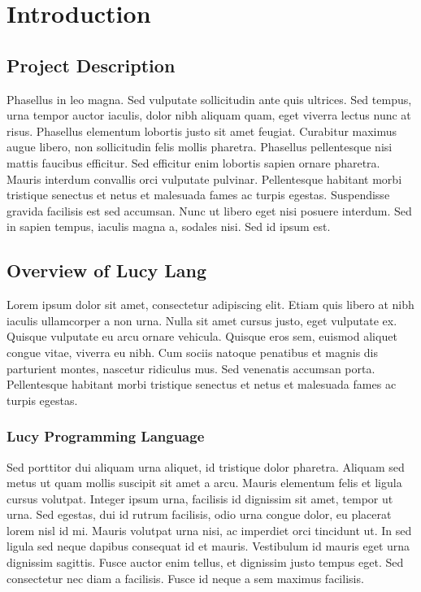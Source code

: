 \chapter{Introduction}


\section{Project Description}
Phasellus in leo magna. Sed vulputate sollicitudin ante quis ultrices. Sed tempus, urna tempor auctor iaculis, dolor nibh aliquam quam, eget viverra lectus nunc at risus. Phasellus elementum lobortis justo sit amet feugiat. Curabitur maximus augue libero, non sollicitudin felis mollis pharetra. Phasellus pellentesque nisi mattis faucibus efficitur. Sed efficitur enim lobortis sapien ornare pharetra. Mauris interdum convallis orci vulputate pulvinar. Pellentesque habitant morbi tristique senectus et netus et malesuada fames ac turpis egestas. Suspendisse gravida facilisis est sed accumsan. Nunc ut libero eget nisi posuere interdum. Sed in sapien tempus, iaculis magna a, sodales nisi. Sed id ipsum est.


\section{Overview of Lucy Lang}
Lorem ipsum dolor sit amet, consectetur adipiscing elit. Etiam quis libero at nibh iaculis ullamcorper a non urna. Nulla sit amet cursus justo, eget vulputate ex. Quisque vulputate eu arcu ornare vehicula. Quisque eros sem, euismod aliquet congue vitae, viverra eu nibh. Cum sociis natoque penatibus et magnis dis parturient montes, nascetur ridiculus mus. Sed venenatis accumsan porta. Pellentesque habitant morbi tristique senectus et netus et malesuada fames ac turpis egestas.

\subsection{Lucy Programming Language}
Sed porttitor dui aliquam urna aliquet, id tristique dolor pharetra. Aliquam sed metus ut quam mollis suscipit sit amet a arcu. Mauris elementum felis et ligula cursus volutpat. Integer ipsum urna, facilisis id dignissim sit amet, tempor ut urna. Sed egestas, dui id rutrum facilisis, odio urna congue dolor, eu placerat lorem nisl id mi. Mauris volutpat urna nisi, ac imperdiet orci tincidunt ut. In sed ligula sed neque dapibus consequat id et mauris. Vestibulum id mauris eget urna dignissim sagittis. Fusce auctor enim tellus, et dignissim justo tempus eget. Sed consectetur nec diam a facilisis. Fusce id neque a sem maximus facilisis.

